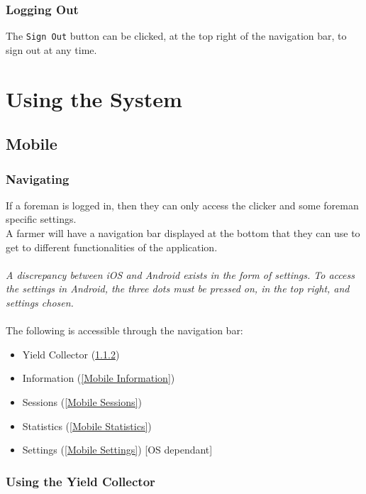\documentclass[11pt]{article}
\begin{document}
\subsubsection{Logging Out}
\label{webLoggingOut}
The \texttt{Sign Out} button can be clicked, at the top right of the navigation bar, to sign out at any time.

\newpage
\section{Using the System}

\subsection{Mobile}
\subsubsection{Navigating}
If a foreman is logged in, then they can only access the clicker and some foreman specific settings.\\
A farmer will have a navigation bar displayed at the bottom that they can use to get to different functionalities of the application.\\
\\
\textit{A discrepancy between iOS and Android exists in the form of settings. To access the settings in Android, the three dots must be pressed on, in the top right, and settings chosen.}\\
\\
The following is accessible through the navigation bar:
\begin{itemize}
\item Yield Collector (\ref{Mobile Yield Collector})
\item Information (\ref{Mobile Information})
\item Sessions (\ref{Mobile Sessions})
\item Statistics (\ref{Mobile Statistics})
\item Settings (\ref{Mobile Settings}) [OS dependant]
\end{itemize}
\subsubsection{Using the Yield Collector}
\label{Mobile Yield Collector}
\end{document}
